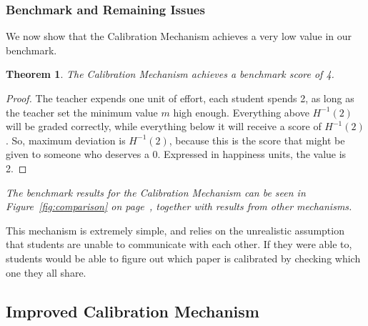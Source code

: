 \documentclass[12pt, Arial]{article}
\newtheorem{theorem}{Theorem}
\begin{document}
\subsubsection{Benchmark and Remaining Issues}
We now show that the Calibration Mechanism achieves a very low value in our benchmark.
\begin{theorem}
The Calibration Mechanism achieves a benchmark score of 4.
\end{theorem}
\begin{proof}
The teacher expends one unit of effort, each student spends 2, as long as the teacher set the minimum value $m$ high enough.
Everything above $H^{-1}(2)$ will be graded correctly, while everything below it will receive a score of $H^{-1}(2)$.
So, maximum deviation is $H^{-1}(2)$, because this is the score that might be given to someone who deserves a 0. Expressed in happiness units, the value is 2.
\end{proof}

\emph{The benchmark results for the Calibration Mechanism can be seen in Figure~\ref{fig:comparison} on page~\pageref{fig:comparison}, together with results from other mechanisms.}

This mechanism is extremely simple, and relies on the unrealistic assumption that students are unable to communicate with each other. If they were able to, students would be able to figure out which paper is calibrated by checking which one they all share.
\subsection{Improved Calibration Mechanism}
\end{document}
